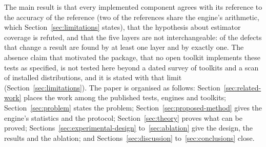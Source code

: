 The main result is that every implemented component agrees with its reference to the accuracy of the reference (two of the references share the engine's arithmetic, which Section~\ref{sec:limitations} states), that the hypothesis about estimator coverage is refuted, and that the five layers are not interchangeable: \ablAny{} of the \ablReal{} defects that change a result are found by at least one layer and \ablOnly{} by exactly one. The absence claim that motivated the package, that no open toolkit implements these tests as specified, is not tested here beyond a dated survey of \pypiFound{} toolkits and a scan of \distScanned{} installed distributions, and it is stated with that limit (Section~\ref{sec:limitations}). The paper is organised as follows: Section~\ref{sec:related-work} places the work among the published tests, engines and toolkits; Section~\ref{sec:problem} states the problem; Section~\ref{sec:proposed-method} gives the engine's statistics and the protocol; Section~\ref{sec:theory} proves what can be proved; Sections~\ref{sec:experimental-design} to~\ref{sec:ablation} give the design, the results and the ablation; and Sections~\ref{sec:discussion} to~\ref{sec:conclusions} close.
